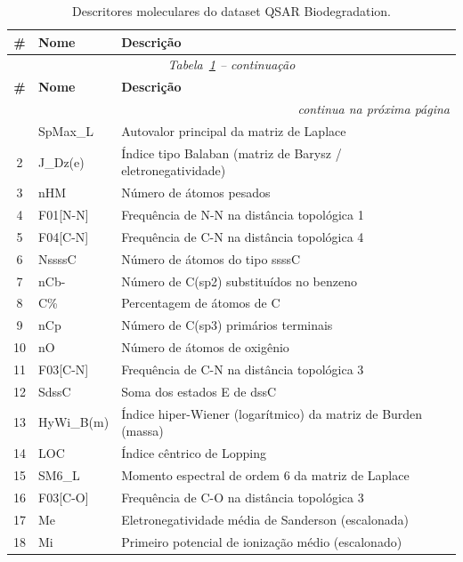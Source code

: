 \documentclass[12pt, a4paper]{article}
\begin{document}
\begin{longtable}{clp{9cm}}
\caption{Descritores moleculares do dataset QSAR Biodegradation.}
\label{tab:descritores} \\
\toprule
\textbf{\#} & \textbf{Nome} & \textbf{Descrição} \\
\midrule
\endfirsthead
\multicolumn{3}{c}{\small\textit{Tabela~\ref{tab:descritores} -- continuação}} \\
\toprule
\textbf{\#} & \textbf{Nome} & \textbf{Descrição} \\
\midrule
\endhead
\midrule
\multicolumn{3}{r}{\small\textit{continua na próxima página}} \\
\endfoot
\bottomrule
\endlastfoot
1  & SpMax\_L      & Autovalor principal da matriz de Laplace \\
2  & J\_Dz(e)      & Índice tipo Balaban (matriz de Barysz / eletronegatividade) \\
3  & nHM           & Número de átomos pesados \\
4  & F01[N-N]      & Frequência de N-N na distância topológica 1 \\
5  & F04[C-N]      & Frequência de C-N na distância topológica 4 \\
6  & NssssC        & Número de átomos do tipo ssssC \\
7  & nCb-          & Número de C(sp2) substituídos no benzeno \\
8  & C\%           & Percentagem de átomos de C \\
9  & nCp           & Número de C(sp3) primários terminais \\
10 & nO            & Número de átomos de oxigênio \\
11 & F03[C-N]      & Frequência de C-N na distância topológica 3 \\
12 & SdssC         & Soma dos estados E de dssC \\
13 & HyWi\_B(m)   & Índice hiper-Wiener (logarítmico) da matriz de Burden (massa) \\
14 & LOC           & Índice cêntrico de Lopping \\
15 & SM6\_L        & Momento espectral de ordem 6 da matriz de Laplace \\
16 & F03[C-O]      & Frequência de C-O na distância topológica 3 \\
17 & Me            & Eletronegatividade média de Sanderson (escalonada) \\
18 & Mi            & Primeiro potencial de ionização médio (escalonado) \\

\end{longtable}
\end{document}

